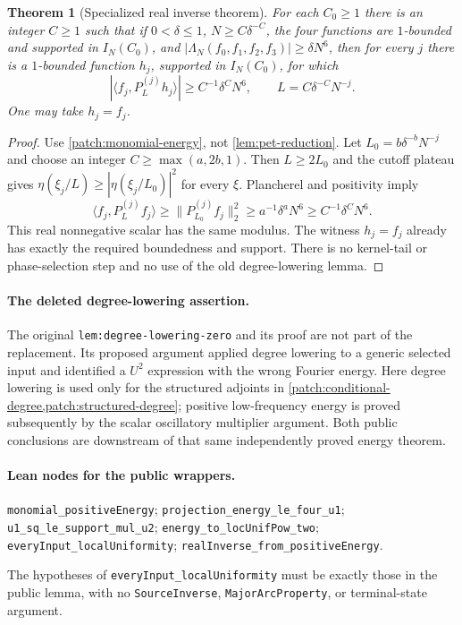 \documentclass[11pt]{article}
\newtheorem{theorem}{Theorem}[section]
\theoremstyle{definition}
\newcommand{\pid}[1]{\nolinkurl{#1}}
\begin{document}
\begin{theorem}[Specialized real inverse theorem]\label{thm:real-inverse}
For each $C_0\geq1$ there is an integer $C\geq1$ such that if $0<\delta\leq1$,
$N\geq C\delta^{-C}$, the four functions are $1$-bounded and supported in $I_N(C_0)$,
and $|\Lambda_N(f_0,f_1,f_2,f_3)|\geq\delta N^6$, then for every $j$ there is a
$1$-bounded function $h_j$, supported in $I_N(C_0)$, for which
\[
 |\langle f_j,P_L^{(j)}h_j\rangle|\geq C^{-1}\delta^C N^6,
                   \qquad L=C\delta^{-C}N^{-j}.
\]
One may take $h_j=f_j$.
\end{theorem}
\begin{proof}
Use \cref{patch:monomial-energy}, not \cref{lem:pet-reduction}.
Let $L_0=b\delta^{-b}N^{-j}$ and choose an integer $C\geq\max(a,2b,1)$.
Then $L\geq2L_0$ and the cutoff plateau gives
$\eta(\xi_j/L)\geq|\eta(\xi_j/L_0)|^2$ for every $\xi$.
Plancherel and positivity imply
\[
 \langle f_j,P_L^{(j)}f_j\rangle
       \geq\|P_{L_0}^{(j)}f_j\|_2^2
       \geq a^{-1}\delta^aN^6
       \geq C^{-1}\delta^CN^6.
\]
This real nonnegative scalar has the same modulus.  The witness $h_j=f_j$ already has
exactly the required boundedness and support.  There is no kernel-tail or phase-selection
step and no use of the old degree-lowering lemma.
\end{proof}

\paragraph{The deleted degree-lowering assertion.}
The original \pid{lem:degree-lowering-zero} and its proof are not part of the replacement.
Its proposed argument applied degree lowering to a generic selected input and identified a
$U^2$ expression with the wrong Fourier energy.  Here degree lowering is used only for the
structured adjoints in \cref{patch:conditional-degree,patch:structured-degree}; positive
low-frequency energy is proved subsequently by the scalar oscillatory multiplier argument.
Both public conclusions are downstream of that same independently proved energy theorem.

\paragraph{Lean nodes for the public wrappers.}
\mbox{}\par
{\small\raggedright
\pid{monomial_positiveEnergy}; \pid{projection_energy_le_four_u1};
\pid{u1_sq_le_support_mul_u2}; \pid{energy_to_locUnifPow_two};
\pid{everyInput_localUniformity}; \pid{realInverse_from_positiveEnergy}.
\par}
The hypotheses of \pid{everyInput_localUniformity} must be exactly those in the public
lemma, with no \pid{SourceInverse}, \pid{MajorArcProperty}, or terminal-state argument.
\end{document}
